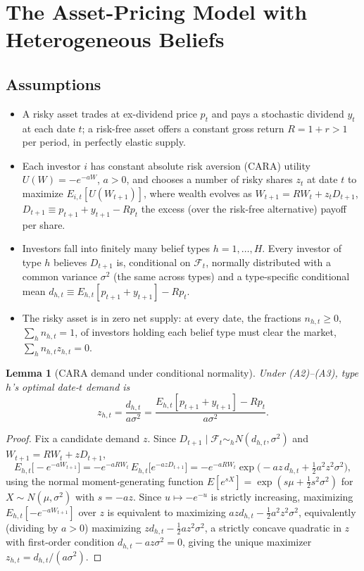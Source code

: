 \documentclass[11pt]{article}
\newtheorem{lemma}{Lemma}
\theoremstyle{remark}
\theoremstyle{definition}
\begin{document}
\section{The Asset-Pricing Model with Heterogeneous Beliefs}
\label{sec:model}

\subsection{Assumptions}

\begin{itemize}
\item[(A1)] A risky asset trades at ex-dividend price $p_t$ and pays a stochastic dividend $y_t$ at each date $t$; a risk-free asset offers a constant gross return $R=1+r>1$ per period, in perfectly elastic supply.
\item[(A2)] Each investor $i$ has constant absolute risk aversion (CARA) utility $U(W)=-e^{-aW}$, $a>0$, and chooses a number of risky shares $z_t$ at date $t$ to maximize $E_{i,t}[U(W_{t+1})]$, where wealth evolves as $W_{t+1}=RW_t+z_t D_{t+1}$, $D_{t+1}\equiv p_{t+1}+y_{t+1}-Rp_t$ the excess (over the risk-free alternative) payoff per share.
\item[(A3)] Investors fall into finitely many belief types $h=1,\dots,H$. Every investor of type $h$ believes $D_{t+1}$ is, conditional on $\mathcal F_t$, normally distributed with a common variance $\sigma^2$ (the same across types) and a type-specific conditional mean $d_{h,t}\equiv E_{h,t}[p_{t+1}+y_{t+1}]-Rp_t$.
\item[(A4)] The risky asset is in zero net supply: at every date, the fractions $n_{h,t}\ge0$, $\sum_h n_{h,t}=1$, of investors holding each belief type must clear the market, $\sum_h n_{h,t}z_{h,t}=0$.
\end{itemize}

\begin{lemma}[CARA demand under conditional normality]
\label{lem:cara}
Under (A2)--(A3), type $h$'s optimal date-$t$ demand is
\begin{equation}
z_{h,t} = \frac{d_{h,t}}{a\sigma^2} = \frac{E_{h,t}[p_{t+1}+y_{t+1}]-Rp_t}{a\sigma^2}.
\label{eq:demand}
\end{equation}
\end{lemma}
\begin{proof}
Fix a candidate demand $z$. Since $D_{t+1}\mid\mathcal F_t \sim_h N(d_{h,t},\sigma^2)$ and $W_{t+1}=RW_t+zD_{t+1}$,
\begin{equation*}
E_{h,t}\big[-e^{-aW_{t+1}}\big] = -e^{-aRW_t}\,E_{h,t}\big[e^{-azD_{t+1}}\big] = -e^{-aRW_t}\exp\!\Big(-az\,d_{h,t}+\tfrac12 a^2z^2\sigma^2\Big),
\end{equation*}
using the normal moment-generating function $E[e^{sX}]=\exp(s\mu+\tfrac12s^2\sigma^2)$ for $X\sim N(\mu,\sigma^2)$ with $s=-az$. Since $u\mapsto -e^{-u}$ is strictly increasing, maximizing $E_{h,t}[-e^{-aW_{t+1}}]$ over $z$ is equivalent to maximizing $azd_{h,t}-\tfrac12a^2z^2\sigma^2$, equivalently (dividing by $a>0$) maximizing $zd_{h,t}-\tfrac12az^2\sigma^2$, a strictly concave quadratic in $z$ with first-order condition $d_{h,t}-az\sigma^2=0$, giving the unique maximizer $z_{h,t}=d_{h,t}/(a\sigma^2)$.
\end{proof}
\end{document}
